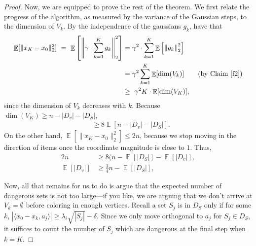 \documentclass{article}
\theoremstyle{theorem}
\theoremstyle{definition}
\newcommand{\E}{\mathop{\mathbb{E}}}
\begin{document}
\begin{remark}
\begin{proof}
Now, we are equipped to prove the rest of the theorem.
We first relate the progress of the algorithm, as measured by the variance of the Gaussian steps, to the dimension of $V_k$.
By the independence of the gaussians $g_k$, have that
\begin{align*}
\E[\|x_{K} - x_0\|_2^2]
~=~ \E\left[\left\|\gamma \cdot \sum_{k=1}^K g_k\right\|_2^2\right]
&= \gamma^2 \cdot \sum_{k=1}^K \E\left[\left\|g_k\right\|_2^2\right]\\
    &= \gamma^2 \sum_{k=1}^K \E[\dim(V_k)] \qquad (\text{by Claim \ref{f2}})\\
&\ge~ \gamma^2 K \cdot \E[\dim(V_K)],
\end{align*}
since the dimension of $V_k$ decreases with $k$. Because $\dim(V_K) \ge n - |D_v| - |D_S|$,
\begin{align*}
&\ge 8 \E[n - |D_v| - |D_S|].
\end{align*}
On the other hand, $\E[\|x_{K} - x_0\|_2^2] \le 2n$, because we stop moving in the direction of items once the coordinate magnitude is close to $1$.
Thus,
\begin{align}
2n &\ge 8 (n - \E[|D_S|] - \E[|D_v|],\nonumber\\
    \E[|D_v|] &\ge \frac{3}{4}n - \E[|D_S|],\label{dsbd}
\end{align}

Now, all that remains for us to do is argue that the expected number of dangerous sets is not too large---if you like, we are arguing that we don't arrive at $V_k = \emptyset$ before coloring in enough vertices.
    Recall a set $S_j$ is in $D_S$ only if for some $k$, $|\langle x_0 - x_k, a_j\rangle| \ge \lambda_i\sqrt{|S_j|} - \delta$.
Since we only move orthogonal to $a_j$ for $S_j \in D_S$, it suffices to count the number of $S_j$ which are dangerous at the final step when $k = K$.


\end{proof}
\end{remark}
\end{document}
